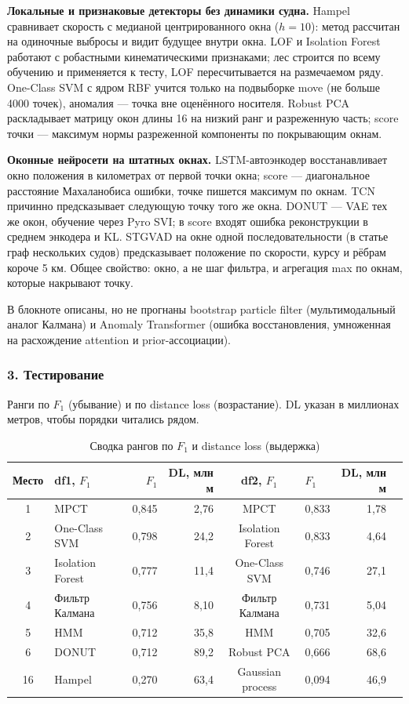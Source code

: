 \documentclass[a4paper,12pt]{report}
\begin{document}
\textbf{Локальные и признаковые детекторы без динамики судна.} Hampel сравнивает скорость с медианой центрированного окна ($h=10$): метод рассчитан на одиночные выбросы и видит будущее внутри окна. LOF и Isolation Forest работают с робастными кинематическими признаками; лес строится по всему обучению и применяется к тесту, LOF пересчитывается на размечаемом ряду. One-Class SVM с ядром RBF учится только на подвыборке move (не больше 4000 точек), аномалия — точка вне оценённого носителя. Robust PCA раскладывает матрицу окон длины 16 на низкий ранг и разреженную часть; score точки — максимум нормы разреженной компоненты по покрывающим окнам.

\textbf{Оконные нейросети на штатных окнах.} LSTM-автоэнкодер восстанавливает окно положения в километрах от первой точки окна; score — диагональное расстояние Махаланобиса ошибки, точке пишется максимум по окнам. TCN причинно предсказывает следующую точку того же окна. DONUT — VAE тех же окон, обучение через Pyro SVI; в score входят ошибка реконструкции в среднем энкодера и KL. STGVAD на окне одной последовательности (в статье граф нескольких судов) предсказывает положение по скорости, курсу и рёбрам короче 5 км. Общее свойство: окно, а не шаг фильтра, и агрегация max по окнам, которые накрывают точку.

В блокноте описаны, но не прогнаны bootstrap particle filter (мультимодальный аналог Калмана) и Anomaly Transformer (ошибка восстановления, умноженная на расхождение attention и prior-ассоциации).

\subsubsection{3. Тестирование}

Ранги по $F_1$ (убывание) и по distance loss (возрастание). DL указан в миллионах метров, чтобы порядки читались рядом.

\begin{table}[H]
\centering
\caption{Сводка рангов по $F_1$ и distance loss (выдержка)}
\footnotesize
\begin{tabular}{clrrclrr}
\toprule
Место & df1, $F_1$ & $F_1$ & DL, млн м & df2, $F_1$ & $F_1$ & DL, млн м \\
\midrule
1 & MPCT & 0{,}845 & 2{,}76 & MPCT & 0{,}833 & 1{,}78 \\
2 & One-Class SVM & 0{,}798 & 24{,}2 & Isolation Forest & 0{,}833 & 4{,}64 \\
3 & Isolation Forest & 0{,}777 & 11{,}4 & One-Class SVM & 0{,}746 & 27{,}1 \\
4 & Фильтр Калмана & 0{,}756 & 8{,}10 & Фильтр Калмана & 0{,}731 & 5{,}04 \\
5 & HMM & 0{,}712 & 35{,}8 & HMM & 0{,}705 & 32{,}6 \\
6 & DONUT & 0{,}712 & 89{,}2 & Robust PCA & 0{,}666 & 68{,}6 \\
16 & Hampel & 0{,}270 & 63{,}4 & Gaussian process & 0{,}094 & 46{,}9 \\
\bottomrule
\end{tabular}
\end{table}
\end{document}
